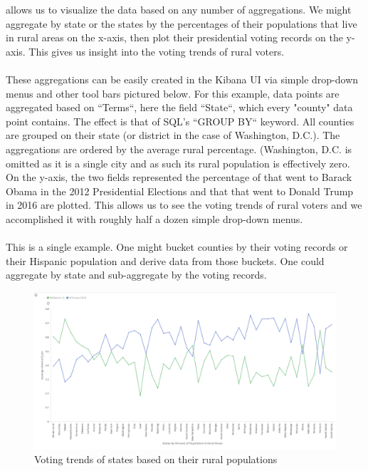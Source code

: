 \documentclass[bibliography=totoc]{article}
\begin{document}
allows us to visualize the data based on any number of aggregations. We might aggregate by state or the
states by the percentages of their populations that live in rural areas on the x-axis, then plot their
presidential voting records on the y-axis. This gives us insight into the voting trends of rural voters.
\\
\\
These aggregations can be easily created in the Kibana UI via simple drop-down menus and other tool bars
pictured below. For this example, data points are aggregated based on ``Terms``, here the field ``State``,
which every "county" data point contains. The effect is that of SQL's ``GROUP BY`` keyword. All counties are
grouped on their state (or district in the case of Washington, D.C.). The aggregations are ordered by the
average rural percentage. (Washington, D.C. is omitted as it is a single city and as such its rural
population is effectively zero. On the y-axis, the two fields represented the percentage of that went to
Barack Obama in the 2012 Presidential Elections and that that went to Donald Trump in 2016 are plotted. This
allows us to see the voting trends of rural voters and we accomplished it with roughly half a dozen simple
drop-down menus.
\\
\\
This is a single example. One might bucket counties by their voting records or their Hispanic population and
derive data from those buckets. One could aggregate by state and sub-aggregate by the voting records. 


\begin{figure}
  \centering
  \includegraphics[width=\linewidth]{rural_voters_visualization.png}
 \caption{Voting trends of states based on their rural populations}
  \label{fig:rural_voter_trends}
\end{figure}
\end{document}
